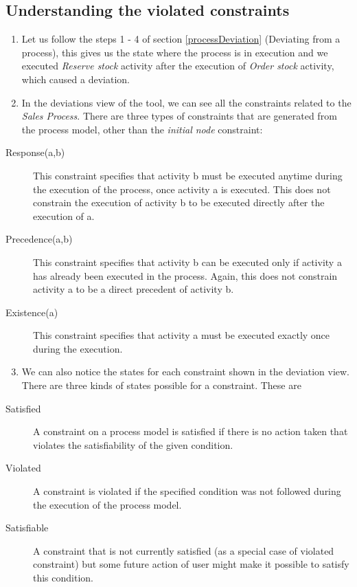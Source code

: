 \documentclass[twoside,a4paper]{refart}
\begin{document}
\subsection{Understanding the violated constraints}

\begin{enumerate}
\item Let us follow the steps 1 - 4 of section \ref{processDeviation} (Deviating from a process), this gives us the state where the process is in execution and we executed \emph{Reserve stock} activity after the execution of \emph{Order stock} activity, which caused a deviation.  

\item In the deviations view of the tool, we can see all the constraints related to the \emph{Sales Process}.   There are three types of constraints that are generated from the process model, other than the \emph{initial node} constraint:
\end{enumerate}

\begin{description}
\item[Response(a,b)]
This constraint specifies that activity b must be executed anytime during the execution of the process, once activity a is executed.  This does not constrain the execution of activity b to be executed directly after the execution of a.

\item[Precedence(a,b)]
This constraint specifies that activity b can be executed only if activity a has already been executed in the process.  Again, this does not constrain activity a to be a direct precedent of activity b.

\item[Existence(a)]
This constraint specifies that activity a must be executed exactly once during the execution. 
\end{description}

\begin{enumerate}
\setcounter{enumi}{2}
\item We can also notice the states for each constraint shown in the deviation view.  There are three kinds of states possible for a constraint. These are
\end{enumerate}

\begin{description}
\item[Satisfied]
A constraint on a process model is satisfied if there is no action taken that violates the satisfiability of the given condition.

\item[Violated] 
A constraint is violated if the specified condition was not followed during the execution of the process model.  

\item[Satisfiable]
A constraint that is not currently satisfied (as a special case of violated constraint) but some future action of user might make it possible to satisfy this condition. 
\end{description}
\end{document}
